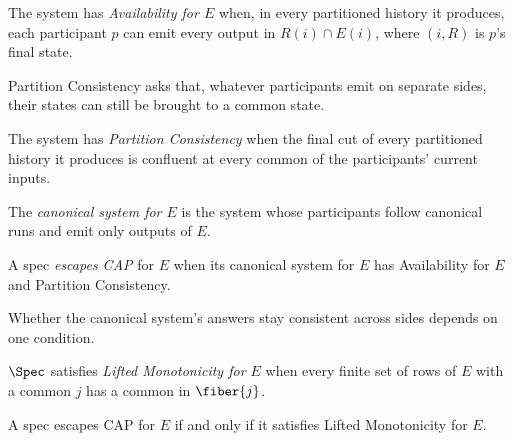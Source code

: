 \begin{definition}[Availability]
\label{def:partition-notions}
The system has \emph{Availability for $E$} when, in every partitioned history
it produces, each participant $p$ can emit every output in $R(i)\cap E(i)$,
where $(i,R)$ is $p$'s final state.
\end{definition}

Partition Consistency asks that, whatever participants emit on separate sides,
their states can still be brought to a common state.

\begin{definition}
\label{def:partition-consistency}
The system has \emph{Partition Consistency} when the final cut of every
partitioned history it produces is confluent at every common \indesc of the
participants' current inputs.
\end{definition}

The \emph{canonical system for $E$} is the system whose participants follow
canonical runs and emit only outputs of $E$.

\begin{definition}
\label{def:escapes-cap}
A spec \emph{escapes CAP} for $E$ when its canonical system for $E$ has
Availability for $E$ and Partition Consistency.
\end{definition}

Whether the canonical system's answers stay consistent across sides depends on
one condition.

\begin{definition}
\label{def:lm-for-A}
$\Spec$ satisfies \emph{Lifted Monotonicity for $E$} when every finite set of
rows of $E$ with a common \indesc $j$ has a common \outnoun in $\fiber{j}$.
\end{definition}

\begin{theorem}
\label{thm:complete-cap}
A spec escapes CAP for $E$ if and only if it satisfies Lifted Monotonicity for
$E$.
\end{theorem}

